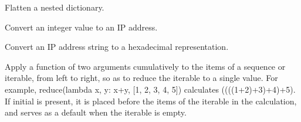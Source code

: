 \documentclass[letterpaper,10pt,english]{sphinxmanual}
\begin{document}
\begin{fulllineitems}
\label{\detokenize{apidocs:subrack_management_board.flatten_dict}}
\pysigstartsignatures
{}
\pysigstopsignatures
\sphinxAtStartPar
Flatten a nested dictionary.

\end{fulllineitems}


\begin{fulllineitems}
\label{\detokenize{apidocs:subrack_management_board.int2ip}}
\pysigstartsignatures
{}
\pysigstopsignatures
\sphinxAtStartPar
Convert an integer value to an IP address.

\end{fulllineitems}


\begin{fulllineitems}
\label{\detokenize{apidocs:subrack_management_board.ipstr2hex}}
\pysigstartsignatures
{}
\pysigstopsignatures
\sphinxAtStartPar
Convert an IP address string to a hexadecimal representation.

\end{fulllineitems}


\begin{fulllineitems}
\label{\detokenize{apidocs:subrack_management_board.reduce}}
\pysigstartsignatures
{}
\pysigstopsignatures
\sphinxAtStartPar
Apply a function of two arguments cumulatively to the items of a sequence
or iterable, from left to right, so as to reduce the iterable to a single
value.  For example, reduce(lambda x, y: x+y, {[}1, 2, 3, 4, 5{]}) calculates
((((1+2)+3)+4)+5).  If initial is present, it is placed before the items
of the iterable in the calculation, and serves as a default when the
iterable is empty.

\end{fulllineitems}
\end{document}
